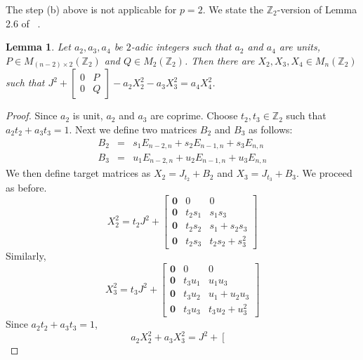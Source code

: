 \documentclass[12pt,a4paper]{article}
\newtheorem{lem}{Lemma}[section]
\begin{document}
	The step (b) above is not applicable for $p=2$. We state the  $\mathbb{Z}_2$-version of Lemma 2.6 of ~\cite{Koo2025}. 
	\begin{lem} \label{Lemma 2.6 for p=2}
		Let $a_2,a_3,a_4$ be $2$-adic integers such that $a_2$ and $a_4$ are units, $P \in M_{(n-2) \times 2}(\mathbb{Z}_2)$ and $Q \in M_2(\mathbb{Z}_2)$. Then there are $X_2,X_3,X_4 \in M_n(\mathbb{Z}_2)$ such that $J^2 + \begin{bmatrix}
			0 & P\\
			0 & Q
		\end{bmatrix} - a_2X_2^2 - a_3 X_3^2 = a_4 X_4^2 $. 
	\end{lem}
	\begin{proof}
		Since $a_2$ is unit, $a_2$ and $a_3$ are coprime. Choose $t_2, t_3 \in \mathbb{Z}_2$ such that $a_2t_2 + a_3t_3 = 1$. Next we define two matrices $B_2$ and $B_3$ as follows:
		\begin{eqnarray*}
			B_2 &=& s_1 E_{n-2,n} + s_2 E_{n-1,n} +s_3 E_{n,n} \\
			B_3 &=& u_1 E_{n-2,n} + u_2 E_{n-1,n} + u_3 E_{n,n}
		\end{eqnarray*}
		We then define target matrices as $X_2 = J_{t_2} + B_2$ and $X_3= J_{t_3} + B_3$. We proceed as before.  		\begin{equation*}
			X_2^2 = t_2J^2 + 
			\left[
			\begin{array}{c|cc}
				\textbf{0} & 0 & 0 \\ \textbf{0} & t_2s_1 & s_1s_3 \\\hline
				\textbf{0} & t_2s_2 & s_1+s_2s_3 \\
				\textbf{0} & t_2s_3 & t_2s_2+s_3^2
			\end{array}
			\right]
		\end{equation*}
		Similarly, 
		\begin{equation*}
			X_3^2 = t_3J^2 + 
			\left[
			\begin{array}{c|cc}
				\textbf{0} & 0 & 0 \\ 
				\textbf{0} & t_3u_1 & u_1u_3 \\ \hline
				\textbf{0} & t_3u_2 & u_1+u_2u_3 \\ 
				\textbf{0} & t_3u_3 & t_3u_2+u_3^2
			\end{array}
			\right]
		\end{equation*}
	Since $a_2t_2 + a_3t_3 = 1$,
	\begin{equation} \label{Eq LHS for Z2}
		a_2 X_2^2 + a_3 X_3^2 = J^2 + \left[
		\begin{array}{c|cc}

\end{array}
\end{equation}
\end{proof}
\end{document}
